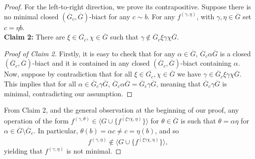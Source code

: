 \documentclass{article}
\newcommand{\remmic}[1]{\textcolor{orange}{TODO: #1}}
\theoremstyle{remark}
\theoremstyle{definition}
\def\acts{\curvearrowright}
\begin{document}
\begin{proof}
For the left-to-right direction, we prove its contrapositive. Suppose there is no minimal closed $(\overline{G}_c, \overline{G})$-biact for any $c\sim b$. {For any $f^{(\gamma, \eta)}$, with $\gamma, \eta\in\overline{G}$
set $c=\eta b$.}\\

{\textbf{Claim 2:} There are $\xi\in \overline{G_c}, \chi\in \overline{G}$ such that  $\gamma\not\in\overline{G}_c\xi\gamma\chi\overline{G}$.} 
\begin{proof}[Proof of Claim 2]{ Firstly, it is easy to check that for any $\alpha\in\overline{G}$, $\overline{G}_c\alpha\overline{G}$ is a closed $(\overline{G}_c, \overline{G})$-biact and it is contained in any closed $(\overline{G}_c, \overline{G})$-biact containing $\alpha$. Now, suppose by contradiction that for all $\xi\in \overline{G_c}, \chi\in \overline{G}$ we have $\gamma\in\overline{G}_c\xi\gamma\chi\overline{G}$. This implies that for all $\alpha\in \overline{G}_c\gamma\overline{G}$, $\overline{G}_c\alpha\overline{G}=\overline{G}_c\gamma\overline{G}$, meaning that $\overline{G}_c\gamma\overline{G}$ is minimal, contradicting our assumption.}   
\end{proof}
{From Claim 2, and the general observation at the beginning of our proof, any operation of the form $f^{(\gamma, \theta)}\in \overline{\langle G\cup\{f^{(\xi\gamma\chi, \eta)}\}\rangle}$ for $\theta\in \overline{G}$ is such that $\theta=\alpha\eta$ for $\alpha\in\overline{G}\setminus\overline{G}_c$. In particular, $\theta(b)=\alpha c\neq c=\eta(b)$, and so }  
\[f^{(\gamma, \eta)}\not\in\overline{\langle G\cup\{f^{(\xi\gamma\chi, \eta)}\}\rangle},\]
yielding that $f^{(\gamma, \eta)}$ is not minimal. 
\end{proof}


\end{document}
